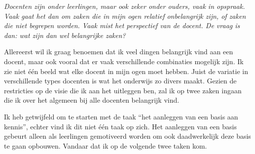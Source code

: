 \documentclass{article}
\begin{document}
            {\itshape              
                Docenten zijn onder leerlingen, maar ook zeker onder ouders, vaak in opspraak. Vaak gaat het dan om zaken die in mijn ogen relatief onbelangrijk zijn, of zaken die niet begrepen worden. Vaak mist het perspectief van de docent. De vraag is dan: wat zijn dan wel belangrijke zaken?
                
                Allereerst wil ik graag benoemen dat ik veel dingen belangrijk vind aan een docent, maar ook vooral dat er vaak verschillende combinaties mogelijk zijn. Ik zie niet één beeld wat elke docent in mijn ogen moet hebben. Juist de variatie in verschillende types docenten is wat het onderwijs zo divers maakt. Gezien de restricties op de visie die ik aan het uitleggen ben, zal ik op twee zaken ingaan die ik over het algemeen bij alle docenten belangrijk vind.
                
                Ik heb getwijfeld om te starten met de taak “het aanleggen van een basis aan kennis”, echter vind ik dit niet één taak op zich. Het aanleggen van een basis gebeurt alleen als leerlingen gemotiveerd worden om ook daadwerkelijk deze basis te gaan opbouwen. Vandaar dat ik op de volgende twee taken kom.
                
}
\end{document}
